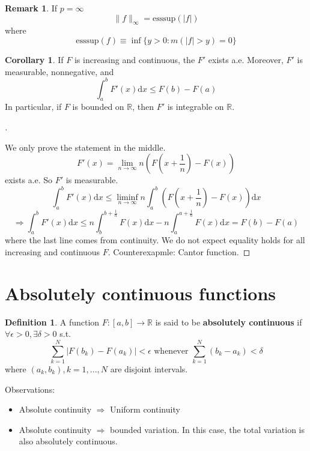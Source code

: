 \documentclass{article}
\theoremstyle{definition}
\newtheorem{dfn}{Definition}
\newtheorem{rem}{Remark}
\newtheorem{cor}{Corollary}
\newenvironment{proofs}[1][\proofname]{%
  \begin{proof}[#1]$ $\par\nobreak\ignorespaces
}{%
  \end{proof}
}
\begin{document}
\begin{rem}
  If $p = \infty$
  \[
    \|f\|_{\infty} = \text{esssup} (|f|)
  \]
  where
  \[
    \text{esssup} (f) \equiv \inf \{y > 0: m(|f| > y) = 0\}
  \]
\end{rem}

\begin{cor}
  If $F$ is increasing and continuous, the $F'$ exists a.e. Moreover, $F'$ is measurable, nonnegative, and 
  \[
    \int_a^b F'(x) \mathrm{d} x \leq F(b) - F(a)
  \]
  In particular, if $F$ is bounded on $\mathbb{R}$, then $F'$ is integrable on $\mathbb{R}$. 
\end{cor}

\begin{proofs}
  We only prove the statement in the middle. 
  \[
    F'(x) = \lim_{n \to \infty} n (F(x +  \frac{1}{n}) - F(x))
  \]
  exists a.e. So $F'$ is measurable. 
  \[
    \int_a^b F'(x) \mathrm{d}x \leq \liminf_{n \to \infty} n\int_a^b (F(x + \frac{1}{n}) - F(x)) \mathrm{d} x
  \]
  \[
    \Rightarrow \int_a^b F'(x) \mathrm{d}x \leq n \int_b^{b + \frac{1}{n}} F(x) \mathrm{d} x - n \int_a^{a + \frac{1}{n}} F(x) \mathrm{d} x = F(b) - F(a)
  \]
  where the last line comes from continuity. We do not expect equality holds for all increasing and continuous $F$. Counterexapmle: Cantor function. 

\end{proofs}

\section{Absolutely continuous functions}

\begin{dfn}
	A function $F:[a, b] \to \mathbb{R}$ is said to be \textbf{absolutely continuous} if $\forall \epsilon > 0, \exists \delta > 0$ s.t.
  \[
    \sum_{k =1}^N |F(b_k ) - F(a_k)| < \epsilon \text{ whenever } \sum_{k = 1}^N (b_k - a_k) < \delta
  \]
  where $(a_k, b_k), k = 1, ..., N$ are disjoint intervals. 
\end{dfn}

Observations:

\begin{itemize}
  \item Absolute continuity $\Rightarrow$ Uniform continuity
  \item Absolute continuity $\Rightarrow$ bounded variation. In this case, the total variation is also absolutely continuous. 
\end{itemize}
\end{document}
